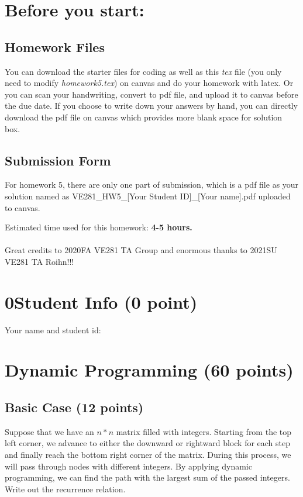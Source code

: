 \documentclass[11pt]{exam}
\newcommand{\hwnum}{5}
\begin{document}
\setlength{\parindent}{0pt}
\section*{Before you start:}

\subsection*{Homework Files}
You can download the starter files for coding as well as this \textit{tex} file (you only need to modify \textit{homework\hwnum.tex}) on canvas and do your homework with latex. Or you can scan your handwriting, convert to pdf file, and upload it to canvas before the due date. If you choose to write down your answers by hand, you can directly download the pdf file on canvas which provides more blank space for solution box.

\subsection*{Submission Form}
For homework \hwnum, there are only one part of submission, which is a pdf file as your solution named as VE281\_HW\hwnum\_[Your Student ID]\_[Your name].pdf uploaded to canvas.

Estimated time used for this homework: \textbf{4-5 hours.}
\\\\
Great credits to 2020FA VE281 TA Group and enormous thanks to 2021SU VE281 TA Roihn!!!

\newpage
\section*{0\quad Student Info (0 point)}
Your name and student id:
\begin{solution}
\end{solution}

\section{Dynamic Programming (60 points)}
\subsection{Basic Case (12 points)}
Suppose that we have an $n*n$ matrix filled with integers. Starting from the top left corner, we advance to either the downward or rightward block for each step and finally reach the bottom right corner of the matrix. During this process, we will pass through nodes with different integers. By applying dynamic programming, we can find the path with the largest sum of the passed integers. Write out the recurrence relation.
\begin{solution}
\end{solution}
\end{document}
